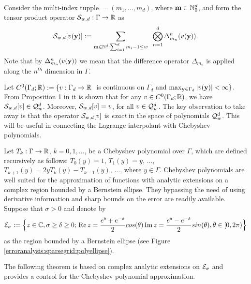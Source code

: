 \documentclass[11pt,final]{amsart}       %
\begin{document}
Consider the multi-index tupple $\bm = (m_1,\dots,m_d)$, where $\mathbf{m}
\in \mathbb{N}_0^{d}$, and form the tensor product operator
$\mathcal{S}_{w,d}: \Gamma \rightarrow \Bbb{R}$ as
\begin{equation}
  \mathcal{S}_{w,d}
      [v(\mathbf{y})]
      :
      =
 \sum_{\mathbf{m} \in {\mathbb N}^{d}: \sum_{i=1}^{d} m_i - 1  \leq w } \;\;
 \bigotimes_{n=1}^{d} {\Delta^{n}_{m_n}}(v(\mathbf{y})).
\label{errorestimates:SG}
\end{equation}
Note that by ${\Delta^{n}_{m_n}}(v(\mathbf{y}))$ we mean that the difference
operator ${\Delta_{m_n}}$ is applied along the $n^{th}$ dimension in
$\Gamma$.


Let $C^{0}(\Gamma_d; \Bbb{R}) : = \{ v: \Gamma_d \rightarrow \Bbb{R}\,\,$ is
continuous on $\Gamma_d$ and $\max_{\mathbf{y}\in \Gamma_d} |v(\mathbf{y})| < \infty
\}$.  From Proposition 1 in \cite{Back2011} it is shown that for any
$v \in C^0(\Gamma_d;\Bbb{R})$, we have $\mathcal{S}_{w,d}[v]\in {\mathcal Q}^{d}_{w}$.
Moreover, $\mathcal{S}_{w,d}[v] = v$, for all $v \in {\mathcal Q}^{d}_{w}$. The key
observation to take away is that the operator $\mathcal{S}_{w,d}[v]$ is
\textit{exact} in the space of polynomials ${\mathcal Q}^{d}_{w}$. This will
be useful in connecting the Lagrange interpolant with Chebyshev
polynomials.


Let $T_k:\Gamma \rightarrow \Bbb{R}$, $k = 0, 1, \dots$, be a Chebyshev
polynomial over $\Gamma$, which are defined recursively as follows:
$T_0(y) = 1$, $T_1(y) = y$, $\dots$, $T_{k+1}(y) = 2yT_{k}(y) -
T_{k-1}(y)$, $\dots$, where $y \in \Gamma$. Chebyshev polynomials are
well suited for the approximation of functions with analytic
extensions on a complex region bounded by a Bernstein ellipse. They
bypassing the need of using derivative information and sharp bounds on
the error are readily available. Suppose that $\sigma > 0$ and denote
by
\[
\begin{split}
  {\mathcal E}_{\sigma} := \Big\{
  z \in \mathbb{C}, \sigma \geq
\delta \geq 0 ;\,\mathop{\text{\rm Re}}{z} = \frac{e^{\delta} + e^{-\delta}
}{2}cos(\theta) 
\mathop{\text{\rm Im}}{z} = \frac{e^{\delta} 
  - e^{-\delta}}{2}sin(\theta),
\theta \in [0,2\pi)
  \Big\}
\end{split}
  \]
as the region bounded by a Bernstein ellipse (see Figure
\ref{erroranalysis:sparsegrid:polyellipse}).

The following theorem is based on complex analytic extensions on
${\mathcal E}_{\sigma}$ and provides a control for the Chebyshev polynomial
approximation.
\end{document}
